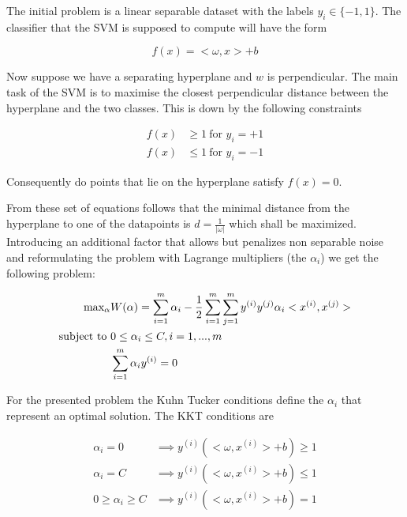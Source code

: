 The initial problem is a linear separable dataset with the labels $y_i \in \{-1, 1\}$. The classifier that the SVM is supposed to compute will have the form

\begin{equation}
    f(x) = <\omega, x> + b
\end{equation}

Now suppose we have a separating hyperplane and $w$ is perpendicular. The main task of the SVM is to maximise the closest perpendicular distance between the hyperplane and the two classes. This is down by the following constraints

\begin{align}
f(x) &\geq 1\ \text{for $y_i = +1$} \\
f(x) &\leq 1\ \text{for $y_i = -1$}
\end{align}

Consequently do points that lie on the hyperplane satisfy $f(x)=0$.

From these set of equations follows that the minimal distance from the hyperplane to one of the datapoints is $d=\frac{1}{|\omega|}$ which shall be maximized. Introducing an additional factor that allows but penalizes non separable noise and reformulating the problem with Lagrange multipliers (the $\alpha _i$) we get the following problem:

\begin{align}
\text{max}_\alpha& W(\alpha) = \sum_{i=1}^m \alpha _i - \frac{1}{2} \sum_{i=1}^m \sum_{j=1}^m y^{(i)} y^{(j)} \alpha _i <x^{(i)}, x^{(j)}> \\
\text{subject to \em} & 0\leq \alpha _i \leq C, i = 1,..., m \\
& \sum_{i=1}^m \alpha _i y^{(i)} = 0
\end{align}

For the presented problem the Kuhn Tucker conditions define the $\alpha _i$ that represent an optimal solution. The KKT conditions are

\begin{align}
\alpha _i = 0 & \implies  y^{(i)}(<\omega, x^{(i)}> + b)  \geq 1 \\
\alpha _i = C & \implies  y^{(i)}(<\omega, x^{(i)}> + b)  \leq 1 \\
0 \geq \alpha _i \geq C & \implies  y^{(i)}(<\omega, x^{(i)}> + b)  = 1 
\end{align}


